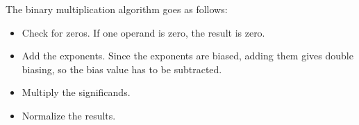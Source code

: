 

The binary multiplication algorithm goes as follows:

\begin{itemize}
  \item Check for zeros. If one operand is zero, the result is zero. 
  \item Add the exponents. Since the exponents are biased, adding them gives double biasing, so the bias value has to be subtracted.
  \item Multiply the significands.
  \item Normalize the results.
\end{itemize}


